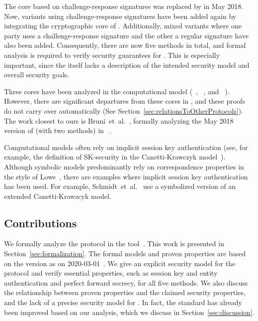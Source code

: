 \documentclass[runningheads, envcountsame, a4paper, draft, x11names]{llncs}
\begin{document}
The core based on challenge-response signatures was replaced by \mSigma{}
in May 2018.
%
Now, variants using challenge-response signatures have been added again by
integrating the cryptographic core of \mOptls{}.
%
Additionally, mixed variants where one party uses a challenge-response
signature and the other a regular signature have also been added.
%
Consequently, there are now five methods in total, and formal analysis is
required to verify security guarantees for \mEdhoc.
%
This is especially important, since the \mSpec{} itself lacks a description
of the intended security model and overall security goals.
%

Three cores have been analyzed in the computational model (\mSigma{}~\cite{DBLP:conf/crypto/CanettiK02},
\mOptls{}~\cite{DBLP:conf/eurosp/KrawczykW16}, and
\mNoise{}~\cite{DBLP:conf/eurosp/KobeissiNB19}).
%
However, there are significant departures from these cores in \mEdhoc, and
these proofs do not carry over automatically
(See Section~\ref{sec:relationsToOtherProtocols}).
%
The work closest to ours is Bruni~et~al.~\cite{DBLP:conf/secsr/BruniJPS18},
formally analyzing the May 2018 version of \mEdhoc{} (with two methods) in
\mProverif~\cite{DBLP:conf/csfw/Blanchet01}.
%


Computational models often rely on implicit session key authentication
(see, for example, the definition of SK-security in the Canetti-Krawczyk
model~\cite{DBLP:conf/crypto/CanettiK02}).
%
Although symbolic models predominantly rely on correspondence properties
in the style of Lowe~\cite{DBLP:conf/csfw/Lowe97a}, there are examples where
implicit session key authentication has been used.
%
For example, Schmidt~et~al.~\cite{DBLP:conf/csfw/SchmidtMCB12} use a
symbolized version of an extended Canetti-Krawzcyk model.
%

\subsection{Contributions}
\label{sec:contributions}
We formally analyze the \mEdhoc{} protocol in the \mTamarin{}
tool~\cite{DBLP:conf/cav/MeierSCB13}.
%
This work is presented in Section~\ref{sec:formalization}.
%
The formal models and proven properties are based on the version as on
2020-03-01~\cite{selander-lake-edhoc-01}.
%
We give an explicit security model for the protocol and verify essential
properties, such as session key and entity authentication and perfect forward
secrecy, for all five methods.
%
We also discuss the relationship between proven properties and the claimed
security properties, and the lack of a precise security model for \mEdhoc{}.
%
In fact, the standard has already been improved based on our analysis,
which we discuss in Section~\ref{sec:discussion}.
%
\end{document}
